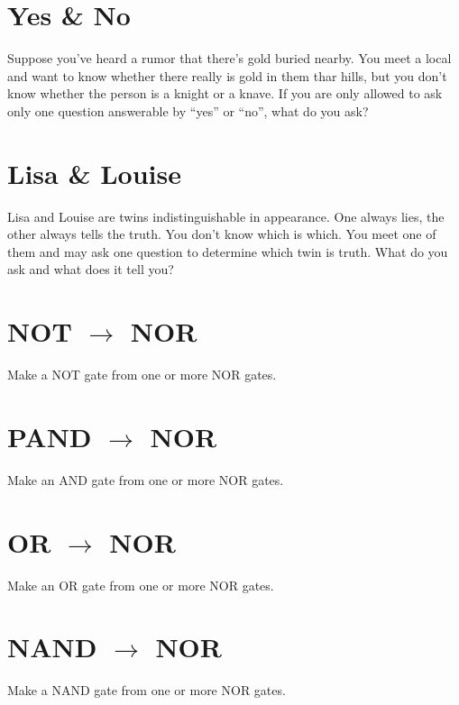 \documentclass[11pt]{book}
\begin{document}
\section{Yes \& No} 
Suppose you’ve heard a rumor that there’s gold buried nearby. You meet a local and want to know whether there really is gold in them thar hills, but you don’t know whether the person is a knight or a knave. If you are only allowed to ask only one question answerable by ``yes'' or ``no'', what do you ask?

\section{Lisa \& Louise}
Lisa and Louise are twins indistinguishable in appearance. One always lies, the other always tells the truth. You don’t know which is which. You meet one of them and may ask one question to determine which twin is truth. What do you ask and what does it tell you?


\section{NOT $\rightarrow$ NOR}
Make a NOT gate from one or more NOR gates.
\section{PAND $\rightarrow$ NOR}
Make an AND gate from one or more NOR gates.
\section{OR $\rightarrow$ NOR}
Make an OR gate from one or more NOR gates.
\section{NAND $\rightarrow$ NOR}
Make a NAND gate from one or more NOR gates.
\end{document}
